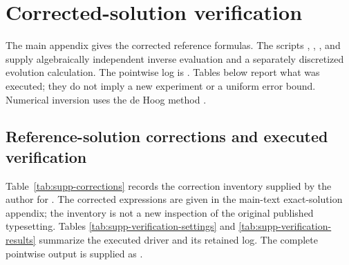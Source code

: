 \documentclass[11pt]{article}
\begin{document}
\section{Corrected-solution verification}

The main appendix gives the corrected reference formulas. The scripts
, , ,
and  supply algebraically independent inverse
evaluation and a separately discretized evolution calculation. The
pointwise log is . Tables below
report what was executed; they do not imply a new experiment or a uniform
error bound. Numerical inversion uses the de Hoog method
\citep{deHoog1982}.

\subsection{Reference-solution corrections and executed verification}
\label{supp:reference-verification}

Table~\ref{tab:supp-corrections} records the correction inventory supplied
by the author for \citet{AlQahtani2026}. The corrected expressions are
given in the main-text exact-solution appendix; the inventory is not a new
inspection of the original published typesetting. Tables
\ref{tab:supp-verification-settings} and \ref{tab:supp-verification-results}
summarize the executed driver and its retained log. The complete pointwise
output is supplied as .
\end{document}
